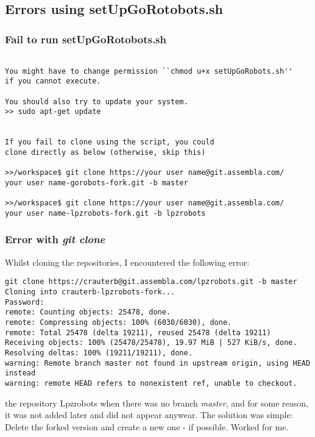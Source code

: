 \subsection{Errors using setUpGoRotobots.sh}

\subsubsection{Fail to run setUpGoRotobots.sh}
\begin{lstlisting}

You might have to change permission ``chmod u+x setUpGoRobots.sh'' 
if you cannot execute.

You should also try to update your system.
>> sudo apt-get update


If you fail to clone using the script, you could
clone directly as below (otherwise, skip this)

>>/workspace$ git clone https://your user name@git.assembla.com/
your user name-gorobots-fork.git -b master

>>/workspace$ git clone https://your user name@git.assembla.com/
your user name-lpzrobots-fork.git -b lpzrobots

\end{lstlisting}

\subsubsection{Error with \emph{git clone}}

Whilst cloning the repositories, I encountered the following error:
\begin{lstlisting}
git clone https://crauterb@git.assembla.com/lpzrobots.git -b master
Cloning into crauterb-lpzrobots-fork...
Password:
remote: Counting objects: 25478, done.
remote: Compressing objects: 100% (6030/6030), done.
remote: Total 25478 (delta 19211), reused 25478 (delta 19211)
Receiving objects: 100% (25478/25478), 19.97 MiB | 527 KiB/s, done.
Resolving deltas: 100% (19211/19211), done.
warning: Remote branch master not found in upstream origin, using HEAD instead
warning: remote HEAD refers to nonexistent ref, unable to checkout.
\end{lstlisting}

the repository Lpzrobots when there was no branch \emph{master}, and for some reason, it was not added later and did not appear anywear.
The solution was simple: Delete the forked version and create a new one - if possible. Worked for me.

